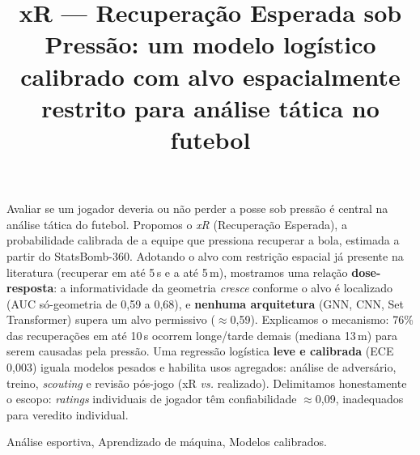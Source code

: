 \documentclass[a4paper,11pt]{article}
\begin{document}
\title{xR --- Recuperação Esperada sob Pressão: um modelo logístico calibrado com alvo espacialmente restrito para análise tática no futebol}

\maketitle
\thispagestyle{fancy}


\author{
}

\author{
}

\author{
}

\vspace{8mm}
\begin{resumo}
Avaliar se um jogador deveria ou não perder a posse sob pressão é central na análise tática do futebol. Propomos o \emph{xR} (Recuperação Esperada), a probabilidade calibrada de a equipe que pressiona recuperar a bola, estimada a partir do StatsBomb-360. Adotando o alvo com restrição espacial já presente na literatura (recuperar em até 5\,s e a até 5\,m), mostramos uma relação \textbf{dose-resposta}: a informatividade da geometria \emph{cresce} conforme o alvo é localizado (AUC só-geometria de 0,59 a 0,68), e \textbf{nenhuma arquitetura} (GNN, CNN, Set Transformer) supera um alvo permissivo ($\approx$0,59). Explicamos o mecanismo: 76\% das recuperações em até 10\,s ocorrem longe/tarde demais (mediana 13\,m) para serem causadas pela pressão. Uma regressão logística \textbf{leve e calibrada} (ECE 0,003) iguala modelos pesados e habilita usos agregados: análise de adversário, treino, \emph{scouting} e revisão pós-jogo (xR \emph{vs.} realizado). Delimitamos honestamente o escopo: \emph{ratings} individuais de jogador têm confiabilidade $\approx$0,09, inadequados para veredito individual.
\end{resumo}

\bigskip
\begin{palchaves}
Análise esportiva, Aprendizado de máquina, Modelos calibrados.

\bigskip
{}
\end{palchaves}
\end{document}
